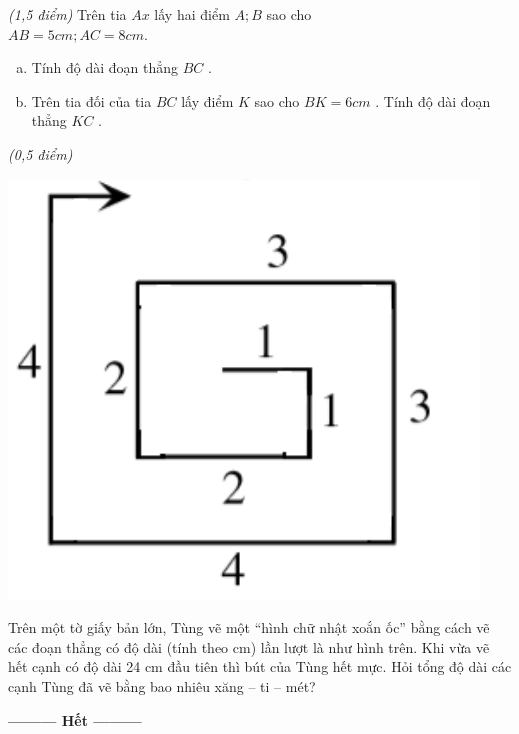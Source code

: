 \begin{ex}
\begin{enumerate}[a)]
\end{enumerate}
\end{ex}     \begin{ex}\textit{(1,5 điểm)} Trên tia $Ax$ lấy hai điểm $A; B$ sao cho\\ $AB=5cm;AC=8cm$.
\begin{enumerate}[a)]
\item Tính độ dài đoạn thẳng $BC$ .
\item Trên tia đối của tia $BC$ lấy điểm $K$ sao cho $BK=6cm$ . Tính độ dài đoạn thẳng $KC$ .
\end{enumerate}
\end{ex}     \begin{ex}\textit{(0,5 điểm)} 
\begin{center}
\includegraphics[scale=0.45]{img/De19}
\end{center}
Trên một tờ giấy bản lớn, Tùng vẽ một “hình chữ nhật xoắn ốc” bằng cách vẽ các đoạn thẳng có độ dài (tính theo cm) lần lượt là   như hình trên. Khi vừa vẽ hết cạnh có độ dài 24 cm đầu tiên thì bút của Tùng hết mực. Hỏi tổng độ dài các cạnh Tùng đã vẽ bằng bao nhiêu  xăng – ti – mét? 
\end{ex}
\begin{center}
\textbf{\textbf{---------} Hết \textbf{---------}}
\end{center}